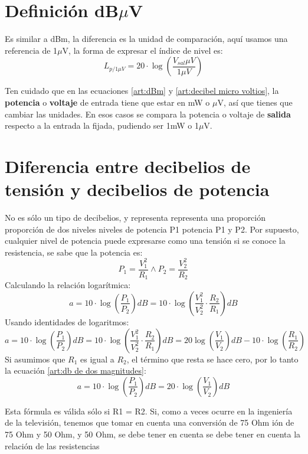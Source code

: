 \documentclass[
	11pt, %
	fleqn, %
	a4paper, %
]{LegrandOrangeBook}
\begin{document}
\section{Definición dB$\mu$V}
Es similar a dBm, la diferencia es la unidad de comparación, aquí usamos una referencia de 1$\mu$V, la forma de expresar el índice de nivel es:
\begin{equation}
\label{art:decibel micro voltios}
L_{p/1\mu V}=20\cdot\log\left(\frac{V_{sal}\mu V}{1\mu V}\right)
\end{equation}
\begin{remark}
Ten cuidado que en las ecuaciones \ref{art:dBm} y \ref{art:decibel micro voltios}, la \textbf{potencia} o \textbf{voltaje} de entrada tiene que estar en mW o $\mu$V, así que tienes que cambiar las unidades. En esos casos se compara la potencia o voltaje de \textbf{salida} respecto a la entrada la fijada, pudiendo ser 1mW o 1$\mu$V.
\end{remark}
\section{Diferencia entre decibelios de tensión y decibelios de potencia}
No es sólo un tipo de decibelios, y representa representa una proporción proporción de dos niveles niveles de potencia P1 potencia P1 y P2. Por supuesto, cualquier nivel de potencia puede expresarse como una tensión si se conoce la resistencia, se sabe que la potencia es:
\begin{displaymath}
P_1=\frac{V^2_1}{R_1} \land P_2=\frac{V^2_2}{R_2}
\end{displaymath}
Calculando la relación logarítmica:
\begin{displaymath}
a=10\cdot\log\left(\frac{P_1}{P_2}\right)dB=10\cdot\log\left(\frac{V_1^2}{V_2^2}\cdot\frac{R_2}{R_1}\right)dB
\end{displaymath}
Usando identidades de logaritmos:
\begin{equation}
\label{art:db de dos magnitudes}
a=10\cdot\log\left(\frac{P_1}{P_2}\right)dB=10\cdot\log\left(\frac{V_1^2}{V_2^2}\cdot\frac{R_2}{R_1}\right)dB=20\log\left(\frac{V_1}{V_2}\right)dB-10\cdot\log\left(\frac{R_1}{R_2}\right)
\end{equation}
Si asumimos que $R_1$ es igual a $R_2$, el término que resta se hace cero, por lo tanto la ecuación \ref{art:db de dos magnitudes}:
\begin{equation}
\label{art:db 10 20}
a=10\cdot\log\left(\frac{P_1}{P_2}\right)dB=20\cdot\log\left(\frac{V_1}{V_2}\right)dB
\end{equation}
\begin{remark}
Esta fórmula es válida sólo si R1 = R2. Si, como a veces ocurre en la ingeniería de la televisión, tenemos que tomar en cuenta una conversión de 75 Ohm ión de 75 Ohm y 50 Ohm, y 50 Ohm, se debe tener en cuenta se debe tener en  cuenta la relación de las resistencias
\end{remark}
\end{document}
